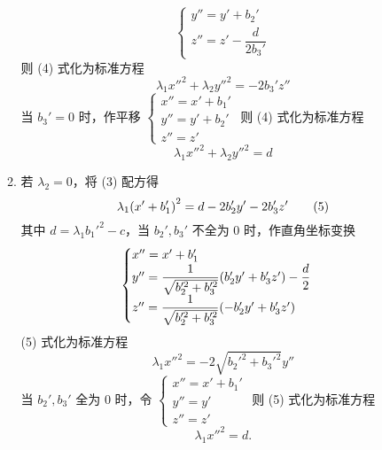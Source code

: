 \begin{enumerate}[label=(\arabic{*})]
\begin{enumerate}[label=(\roman{*})]
$$\begin{cases}
                            y''=y'+b_2' \\
                            z''=z'-\dfrac{d}{2b_3'}
                        \end{cases}$$ 则 (4) 式化为标准方程 $$\lambda_1x''^2+\lambda_2y''^2=-2b_3'z''$$
                    当 $b_3'=0$ 时，作平移 $\begin{cases}
                            x''=x'+b_1' \\
                            y''=y'+b_2' \\
                            z''=z'
                        \end{cases}$ 则 (4) 式化为标准方程 $$\lambda_1x''^2+\lambda_2y''^2=d$$
              \item 若 $\lambda_2=0$，将 (3) 配方得
                    \begin{equation*}
                        \lambda_1\qty(x'+b_1')^2=d-2b_2'y'-2b_3'z'
                        \tag{5}
                    \end{equation*}
                    其中 $d=\lambda_1b_1'^2-c$，当 $b_2',b_3'$ 不全为 0 时，作直角坐标变换
                    $$\begin{cases}
                            x''=x'+b_1'                                                         \\
                            y''=\dfrac{1}{\sqrt{b_2'^2+b_3'^2}}\qty(b_2'y'+b_3'z')-\dfrac{d}{2} \\[6pt]
                            z''=\dfrac{1}{\sqrt{b_2'^2+b_3'^2}}\qty(-b_2'y'+b_3'z')
                        \end{cases}$$
                    (5) 式化为标准方程 $$\lambda_1x''^2=-2\sqrt{b_2'^2+b_3'^2}y''$$
                    当 $b_2',b_3'$ 全为 0 时，令 $\begin{cases}
                            x''=x'+b_1' \\
                            y''=y'      \\
                            z''=z'
                        \end{cases}$ 则 (5) 式化为标准方程 $$\lambda_1x''^2=d.$$
          \end{enumerate}
\end{enumerate}

